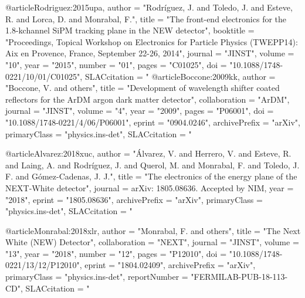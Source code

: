{{{ @article{Rodriguez:2015upa,
      author         = "Rodr\'iguez, J. and Toledo, J. and Esteve, R. and Lorca,
                        D. and Monrabal, F.",
      title          = "{The front-end electronics for the 1.8-kchannel SiPM
                        tracking plane in the NEW detector}",
      booktitle      = "{Proceedings, Topical Workshop on Electronics for
                        Particle Physics (TWEPP14): Aix en Provence, France,
                        September 22-26, 2014}",
      journal        = "JINST",
      volume         = "10",
      year           = "2015",
      number         = "01",
      pages          = "C01025",
      doi            = "10.1088/1748-0221/10/01/C01025",
      SLACcitation   = "%
}
@article{Boccone:2009kk,
      author         = "Boccone, V. and others",
      title          = "{Development of wavelength shifter coated reflectors for
                        the ArDM argon dark matter detector}",
      collaboration  = "ArDM",
      journal        = "JINST",
      volume         = "4",
      year           = "2009",
      pages          = "P06001",
      doi            = "10.1088/1748-0221/4/06/P06001",
      eprint         = "0904.0246",
      archivePrefix  = "arXiv",
      primaryClass   = "physics.ins-det",
      SLACcitation   = "%
}

@article{Alvarez:2018xuc,
      author         = "\'Alvarez, V. and Herrero, V. and Esteve, R. and Laing, A.
                        and Rodr\'iguez, J. and Querol, M. and Monrabal, F. and
                        Toledo, J. F. and G\'omez-Cadenas, J. J.",
      title          = "{The electronics of the energy plane of the NEXT-White
                        detector}",
        journal        = {arXiv: 1805.08636. Accepted by NIM},
      year           = "2018",
      eprint         = "1805.08636",
      archivePrefix  = "arXiv",
      primaryClass   = "physics.ins-det",
      SLACcitation   = "%
      }

@article{Monrabal:2018xlr,
      author         = "Monrabal, F. and others",
      title          = "{The Next White (NEW) Detector}",
      collaboration  = "NEXT",
      journal        = "JINST",
      volume         = "13",
      year           = "2018",
      number         = "12",
      pages          = "P12010",
      doi            = "10.1088/1748-0221/13/12/P12010",
      eprint         = "1804.02409",
      archivePrefix  = "arXiv",
      primaryClass   = "physics.ins-det",
      reportNumber   = "FERMILAB-PUB-18-113-CD",
      SLACcitation   = "%
}


}}}
